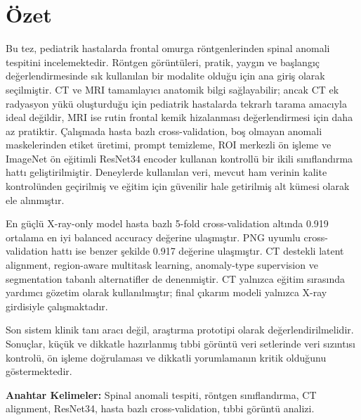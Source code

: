 \chapter*{Özet}

Bu tez, pediatrik hastalarda frontal omurga röntgenlerinden spinal anomali tespitini incelemektedir. Röntgen görüntüleri, pratik, yaygın ve başlangıç değerlendirmesinde sık kullanılan bir modalite olduğu için ana giriş olarak seçilmiştir. CT ve MRI tamamlayıcı anatomik bilgi sağlayabilir; ancak CT ek radyasyon yükü oluşturduğu için pediatrik hastalarda tekrarlı tarama amacıyla ideal değildir, MRI ise rutin frontal kemik hizalanması değerlendirmesi için daha az pratiktir.
Çalışmada hasta bazlı cross-validation, boş olmayan anomali maskelerinden etiket üretimi, prompt temizleme, ROI merkezli ön işleme ve ImageNet ön eğitimli ResNet34 encoder kullanan kontrollü bir ikili sınıflandırma hattı geliştirilmiştir. Deneylerde kullanılan veri, mevcut ham verinin kalite kontrolünden geçirilmiş ve eğitim için güvenilir hale getirilmiş alt kümesi olarak ele alınmıştır.

En güçlü X-ray-only model hasta bazlı 5-fold cross-validation altında 0.919 ortalama en iyi balanced accuracy değerine ulaşmıştır. PNG uyumlu cross-validation hattı ise benzer şekilde 0.917 değerine ulaşmıştır. CT destekli latent alignment, region-aware multitask learning, anomaly-type supervision ve segmentation tabanlı alternatifler de denenmiştir. CT yalnızca eğitim sırasında yardımcı gözetim olarak kullanılmıştır; final çıkarım modeli yalnızca X-ray girdisiyle çalışmaktadır.

Son sistem klinik tanı aracı değil, araştırma prototipi olarak değerlendirilmelidir. Sonuçlar, küçük ve dikkatle hazırlanmış tıbbi görüntü veri setlerinde veri sızıntısı kontrolü, ön işleme doğrulaması ve dikkatli yorumlamanın kritik olduğunu göstermektedir.

\vspace{1cm}
\noindent \textbf{Anahtar Kelimeler:} Spinal anomali tespiti, röntgen sınıflandırma, CT alignment, ResNet34, hasta bazlı cross-validation, tıbbi görüntü analizi.
